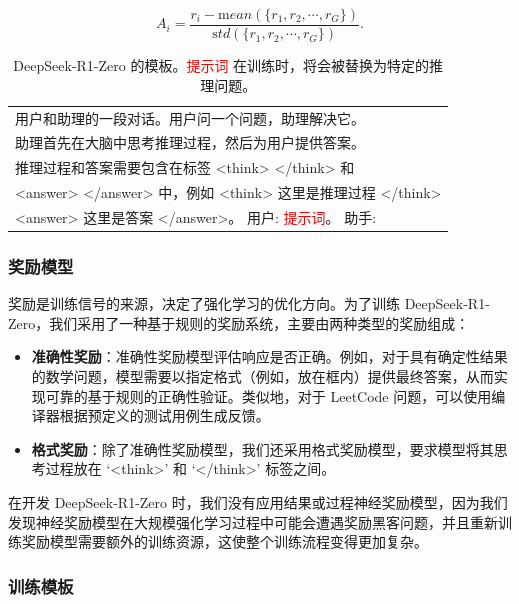 \documentclass[lang=cn,a4paper,newtx]{elegantpaper}
\newcommand{\dsro}{DeepSeek-R1-Zero}
\begin{document}
\begin{equation}
  A_i = \frac{r_i - {\mathrm mean(\{r_1, r_2, \cdots, r_G\})}}{{\mathrm std(\{r_1, r_2, \cdots, r_G\})}}.
\end{equation}

\begin{table}[t]
  \centering
  \small
  \begin{tabular}{l}
  \toprule
  用户和助理的一段对话。用户问一个问题，助理解决它。\\
  助理首先在大脑中思考推理过程，然后为用户提供答案。\\
  推理过程和答案需要包含在标签 <think> </think> 和 \\ <answer> </answer> 中，例如 <think> 这里是推理过程 </think> \\ <answer> 这里是答案 </answer>。 
  用户: \textcolor{red}{提示词}。 助手: \\
  \bottomrule
  \end{tabular}
  \caption{\dsro{} 的模板。\textcolor{red}{提示词} 在训练时，将会被替换为特定的推理问题。}
  \label{tab:r0_template}
\end{table}

\subsubsection{奖励模型}

奖励是训练信号的来源，决定了强化学习的优化方向。为了训练 \dsro{}，我们采用了一种基于规则的奖励系统，主要由两种类型的奖励组成：

\begin{itemize}[topsep=0pt]
  \item \textbf{准确性奖励}：准确性奖励模型评估响应是否正确。例如，对于具有确定性结果的数学问题，模型需要以指定格式（例如，放在框内）提供最终答案，从而实现可靠的基于规则的正确性验证。类似地，对于 LeetCode 问题，可以使用编译器根据预定义的测试用例生成反馈。
  \item \textbf{格式奖励}：除了准确性奖励模型，我们还采用格式奖励模型，要求模型将其思考过程放在 `<think>' 和 `</think>' 标签之间。
\end{itemize}

在开发 \dsro{} 时，我们没有应用结果或过程神经奖励模型，因为我们发现神经奖励模型在大规模强化学习过程中可能会遭遇奖励黑客问题，并且重新训练奖励模型需要额外的训练资源，这使整个训练流程变得更加复杂。

\subsubsection{训练模板}
\end{document}
